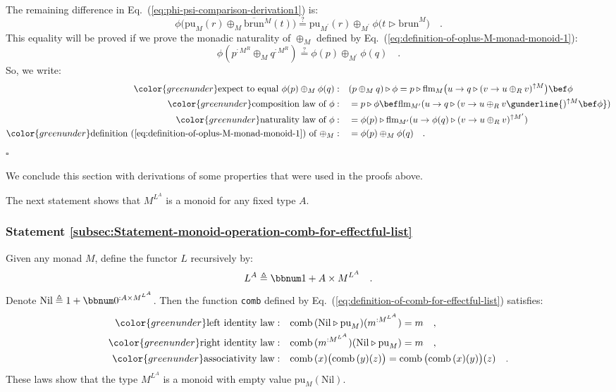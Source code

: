 The remaining difference in Eq.~(\ref{eq:phi-psi-comparison-derivation1})
is:
\[
\phi\big(\text{pu}_{M}(r)\oplus_{M}\overline{\text{brun}}{}^{M}(t)\big)\overset{?}{=}\text{pu}_{M^{\prime}}(r)\oplus_{M^{\prime}}\phi\big(t\triangleright\text{brun}^{M}\big)\quad.
\]
This equality will be proved if we prove the monadic
naturality of $\oplus_{M}$ defined by Eq.~(\ref{eq:definition-of-oplus-M-monad-monoid-1}):
\[
\phi(p^{:M^{R}}\oplus_{M}q^{:M^{R}})\overset{?}{=}\phi(p)\oplus_{M^{\prime}}\phi(q)\quad.
\]
So, we write:
\begin{align*}
{\color{greenunder}\text{expect to equal }\phi(p)\oplus_{M}\phi(q):}\quad & (p\oplus_{M}q)\triangleright\phi=p\triangleright\text{flm}_{M}\big(u\rightarrow q\triangleright(v\rightarrow u\oplus_{R}v)^{\uparrow M}\big)\bef\phi\\
{\color{greenunder}\text{composition law of }\phi:}\quad & =p\triangleright\phi\bef\text{flm}_{M^{\prime}}(u\rightarrow q\triangleright(v\rightarrow u\oplus_{R}v\gunderline{)^{\uparrow M}\bef\phi})\\
{\color{greenunder}\text{naturality law of }\phi:}\quad & =\phi(p)\triangleright\text{flm}_{M^{\prime}}(u\rightarrow\phi(q)\triangleright(v\rightarrow u\oplus_{R}v)^{\uparrow M^{\prime}})\\
{\color{greenunder}\text{definition~(\ref{eq:definition-of-oplus-M-monad-monoid-1}) of }\oplus_{M}:}\quad & =\phi(p)\oplus_{M}\phi(q)\quad.
\end{align*}
$\square$

We conclude this section with derivations of some properties that
were used in the proofs above. 

The next statement shows that $M^{L^{A}}$ is a monoid for any fixed
type $A$.

\subsubsection{Statement \label{subsec:Statement-monoid-operation-comb-for-effectful-list}\ref{subsec:Statement-monoid-operation-comb-for-effectful-list}}

Given any monad $M$, define the functor $L$ recursively by:
\[
L^{A}\triangleq\bbnum 1+A\times M^{L^{A}}\quad.
\]
Denote $\text{Nil}\triangleq1+\bbnum 0^{:A\times M^{L^{A}}}$. Then
the function \lstinline!comb! defined by Eq.~(\ref{eq:definition-of-comb-for-effectful-list})
satisfies:
\begin{align*}
{\color{greenunder}\text{left identity law}:}\quad & \text{comb}\,(\text{Nil}\triangleright\text{pu}_{M})(m^{:M^{L^{A}}})=m\quad,\\
{\color{greenunder}\text{right identity law}:}\quad & \text{comb}\,(m^{:M^{L^{A}}})(\text{Nil}\triangleright\text{pu}_{M})=m\quad,\\
{\color{greenunder}\text{associativity law}:}\quad & \text{comb}\,(x)\big(\text{comb}\,(y)(z)\big)=\text{comb}\,\big(\text{comb}\,(x)(y)\big)(z)\quad.
\end{align*}
These laws show that the type $M^{L^{A}}$ is a monoid with empty
value $\text{pu}_{M}(\text{Nil})$.

